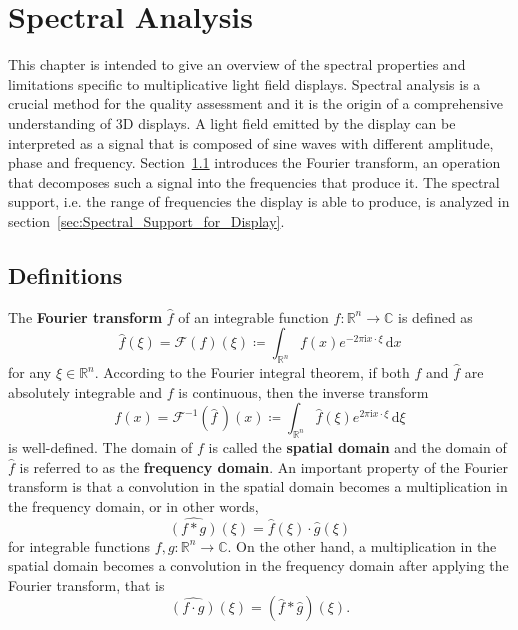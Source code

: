 \chapter{Spectral Analysis}
\label{chp:spectral_analysis}


This chapter is intended to give an overview of the spectral properties and limitations specific to multiplicative light field displays.
Spectral analysis is a crucial method for the quality assessment and it is the origin of a comprehensive understanding of 3D displays. 
A light field emitted by the display can be interpreted as a signal that is composed of sine waves with different amplitude, phase and frequency.
Section~\ref{sec:Definitions} introduces the Fourier transform, an operation that decomposes such a signal into the frequencies that produce it.
The spectral support, i.e. the range of frequencies the display is able to produce, is analyzed in section~\ref{sec:Spectral_Support_for_Display}. 

\section{Definitions}
\label{sec:Definitions}

The \textbf{Fourier transform} $\widehat{f}$ of an integrable function $f \colon \mathbb{R}^n \to \mathbb{C}$ is defined as 
\begin{equation}
	\widehat{f}(\xi) = \mathcal{F}(f)(\xi) \coloneqq \int_{\mathbb{R}^n} f(x) e^{-2 \pi \mathrm{i} x \cdot \xi} \, \mathrm{d}x
\end{equation}
for any $\xi \in \mathbb{R}^n$. 
According to the Fourier integral theorem, if both $f$ and $\widehat{f}$ are absolutely integrable and $f$ is continuous, then the inverse transform 
\begin{equation}
	f(x) = \mathcal{F}^{-1}(\widehat{f} \, )(x) \coloneqq \int_{\mathbb{R}^n} \widehat{f}(\xi) e^{2 \pi \mathrm{i} x \cdot \xi} \, \mathrm{d}\xi
\end{equation}
is well-defined.
The domain of $f$ is called the \textbf{spatial domain} and the domain of $\widehat{f}$ is referred to as the \textbf{frequency domain}.
An important property of the Fourier transform is that a convolution in the spatial domain becomes a multiplication in the frequency domain, or in other words, 
\begin{equation}\label{eq:convolution_theorem_1}
	\widehat{(f \ast g)}(\xi) = \widehat{f}(\xi) \cdot \widehat{g}(\xi)
\end{equation}
for integrable functions $f, g \colon \mathbb{R}^n \to \mathbb{C}$.
On the other hand, a multiplication in the spatial domain becomes a convolution in the frequency domain after applying the Fourier transform, that is
\begin{equation}\label{eq:convolution_theorem_2}
	\widehat{(f \cdot g)}(\xi) = (\widehat{f} \ast \widehat{g})(\xi).
\end{equation}

